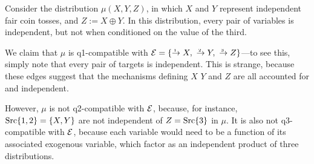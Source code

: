 \documentclass{article}
\begin{document}
    \begin{example}
        Consider the distribution $\mu(X,Y,Z)$, in which $X$ and $Y$ represent independent fair coin tosses, and $Z := X \oplus Y$.
        In this distribution, every pair of variables is independent, but not when conditioned on the value of the third.
        
        We claim that $\mu$ is q1-compatible with $\Ed = \{ \ed1{}X, ~ \ed2{}Y, ~ \ed3{}Z \}$---to see this, simply note that every pair of targets is independent. This is strange, because these edges suggest that the mechanisms defining $X$ $Y$ and $Z$ are all accounted for and independent. 
        
        However, $\mu$ is not q2-compatible with $\mathcal E$, because, for instance,
        $\mathop{\mathrm{Src}} \{1,2\} = \{X,Y\}$ are not independent of $Z = \mathop{\mathrm{Src}} \{3\}$ in $\mu$.
        It is also not q3-compatible with $\mathcal E$, because each variable would need to be a function of its associated exogenous variable, which factor as an independent product of three distributions. 
    \end{example}
    
\end{document}
